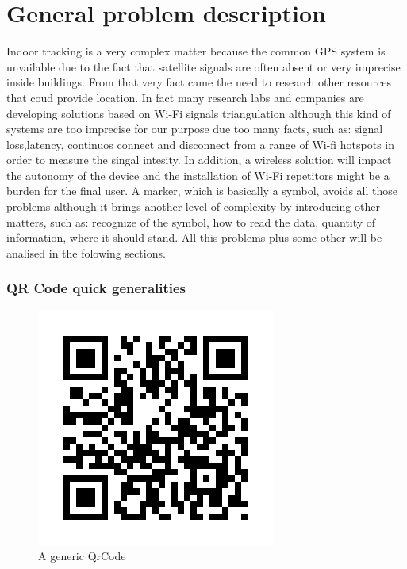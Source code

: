 \chapter{General problem description}
Indoor tracking is a very complex matter because the common GPS system is unvailable due to the fact that satellite signals are often absent or very imprecise inside buildings.
From that very fact came the need to research other resources that coud provide location.
In fact many research labs and companies are developing solutions based on Wi-Fi signals triangulation although this kind of systems are too imprecise for our purpose due too many facts, such as: signal loss,latency, continuos connect and disconnect from a range of Wi-fi hotspots in order to measure the singal intesity.
In addition, a wireless solution will impact the autonomy of the device and the installation of Wi-Fi repetitors might be a burden for the final user.
\newline
A marker, which is basically a symbol, avoids all those problems although it brings another level of complexity by introducing other matters, such as: recognize of the symbol, how to read the data, quantity of information, where it should stand.
All this problems plus some other will be analised in the folowing sections.

\newpage 
\subsection{QR Code quick generalities}

\begin{figure}[hbt]
    \centering
    \caption{A generic QrCode}
    \includegraphics[scale=0.5]{img/qr.png}
\end{figure}

